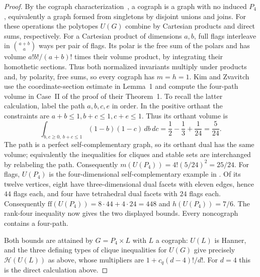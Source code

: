 \documentclass[11pt,a4paper]{article}
\numberwithin{equation}{section}
\begin{document}
\begin{proof}
By the cograph characterization~\cite{Cographs}, a cograph is a graph with no induced $P_4$, equivalently a graph formed from singletons by disjoint unions and joins. For these operations the polytopes $U(G)$ combine by Cartesian products and direct sums, respectively. For a Cartesian product of dimensions $a,b$, full flags interleave in $\binom{a+b}{a}$ ways per pair of flags. Its polar is the free sum of the polars and has volume $a!b!/(a+b)!$ times their volume product, by integrating their homothetic sections. Thus both normalized invariants multiply under products and, by polarity, free sums, so every cograph has $m=h=1$. Kim and Zvavitch~\cite{KZ} use the coordinate-section estimate in Lemma~1 and compute the four-path volume in Case~II of the proof of their Theorem~1. To recall the latter calculation, label the path $a,b,c,e$ in order. In the positive orthant the constraints are $a+b\le1,b+c\le1,c+e\le1$. Thus its orthant volume is
\[
 \int_{b,c\ge0,\ b+c\le1}(1-b)(1-c)\,db\,dc
  =\frac12-\frac13+\frac1{24}=\frac5{24}.
\]
The path is a perfect self-complementary graph, so its orthant dual has the same volume; equivalently the inequalities for cliques and stable sets are interchanged by relabeling the path. Consequently $m(U(P_4))=4!(5/24)^2=25/24$. For flags, $U(P_4)$ is the four-dimensional self-complementary example in \cite[Appendix~A]{Chor}. Of its twelve vertices, eight have three-dimensional dual facets with eleven edges, hence $44$ flags each, and four have tetrahedral dual facets with $24$ flags each. Consequently $\mathrm{ff}(U(P_4))=8\cdot44+4\cdot24=448$ and $h(U(P_4))=7/6$. The rank-four inequality now gives the two displayed bounds. Every noncograph contains a four-path.

Both bounds are attained by $G=P_4\times L$ with $L$ a cograph: $U(L)$ is Hanner, and the three defining types of clique inequalities for $U(G)$ give precisely $\mathcal H(U(L))$ as above, whose multipliers are $1+c_q(d-4)!/d!$. For $d=4$ this is the direct calculation above.


\end{proof}
\end{document}
